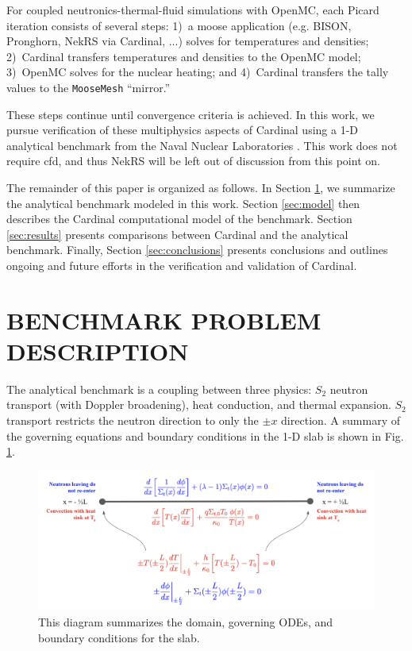 \documentclass[letterpaper]{mc2023}
\begin{document}
For coupled neutronics-thermal-fluid simulations with OpenMC, each Picard iteration consists of several steps: 1)~a \gls{moose}
application (e.g. BISON, Pronghorn, NekRS via Cardinal, ...) solves for temperatures and densities; 2)~Cardinal transfers
temperatures and densities to the OpenMC model; 3)~OpenMC solves for the nuclear heating; and 4)~Cardinal transfers the tally
values to the \texttt{MooseMesh} ``mirror.''

These steps continue until convergence criteria is achieved. In this work, we pursue verification of these multiphysics aspects
of Cardinal using a 1-D analytical benchmark from the Naval Nuclear Laboratories \cite{analytical_benchmark}.  This work does
not require \gls{cfd}, and thus NekRS will be left out of discussion from this point on.

The remainder of this paper is organized as follows. In Section \ref{sec:benchmark}, we summarize the analytical benchmark
modeled in this work. Section \ref{sec:model} then describes the Cardinal computational model of the benchmark. Section
\ref{sec:results} presents comparisons between Cardinal and the analytical benchmark. Finally, Section \ref{sec:conclusions}
presents conclusions and outlines ongoing and future efforts in the verification and validation of Cardinal.

\section{BENCHMARK PROBLEM DESCRIPTION}
\label{sec:benchmark}
The analytical benchmark is a coupling between three physics: $S_2$ neutron transport (with Doppler broadening), heat conduction,
and thermal expansion. $S_{2}$ transport restricts the neutron direction to only the $\pm x$ direction. A summary of the governing
equations and boundary conditions in the 1-D slab is shown in Fig. \ref{fig:slab_diagram}.
\begin{figure}[H]
    \centering
    \includegraphics[width=0.55\linewidth]{figures/1D_Benchmark_Diagram.png}
    \caption{This diagram summarizes the domain, governing ODEs, and boundary conditions for the slab.}
    \label{fig:slab_diagram}
\end{figure}
\end{document}
